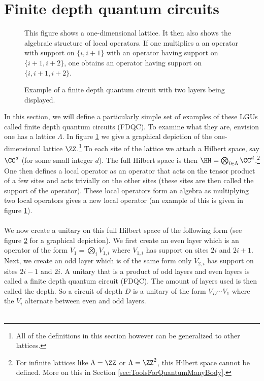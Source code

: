 \section{Finite depth quantum circuits}\label{sec:finite-depth-quantum-circuits}
\begin{figure}
	\centering
	
	\caption{This figure shows a one-dimensional lattice. It then also shows the algebraic structure of local operators. If one multiplies a an operator with support on $\{i,i+1\}$ with an operator having support on $\{i+1,i+2\}$, one obtains an operator having support on $\{i,i+1,i+2\}$.}
	\label{fig:Lattice}
\end{figure}
\begin{figure}
	\centering
	
	\caption{Example of a finite depth quantum circuit with two layers being displayed.}
	\label{fig:FiniteDepthQuantumCirquit}
\end{figure}
In this section, we will define a particularly simple set of examples of these LGUs called finite depth quantum circuits (FDQC). To examine what they are, envision one has a lattice $\Lambda$. In figure \ref{fig:Lattice} we give a graphical depiction of the one-dimensional lattice $\ZZ$.\footnote{All of the definitions in this section however can be generalized to other lattices.} To each site of the lattice we attach a Hilbert space, say $\CC^d$ (for some small integer $d$). The full Hilbert space is then $\HH=\bigotimes_{i\in\Lambda}\CC^d$.\footnote{For infinite lattices like $\Lambda=\ZZ$ or $\Lambda=\ZZ^2$, this Hilbert space cannot be defined. More on this in Section \ref{sec:ToolsForQuantumManyBody}.} One then defines a local operator as an operator that acts on the tensor product of a few sites and acts trivially on the other sites (these sites are then called the support of the operator). These local operators form an algebra as multiplying two local operators gives a new local operator (an example of this is given in figure \ref{fig:Lattice}).
\\\\
We now create a unitary on this full Hilbert space of the following form (see figure \ref{fig:FiniteDepthQuantumCirquit} for a graphical depiction). We first create an even layer which is an operator of the form $V_1=\bigotimes_{i}V_{1,i}$ where $V_{1,i}$ has support on sites $2i$ and $2i+1$. Next, we create an odd layer which is of the same form only $V_{2,i}$ has support on sites $2i-1$ and $2i$. A unitary that is a product of odd layers and even layers is called a finite depth quantum circuit (FDQC). The amount of layers used is then called the depth. So a circuit of depth $D$ is a unitary of the form $V_D\cdots V_1$ where the $V_i$ alternate between even and odd layers.\\\\
